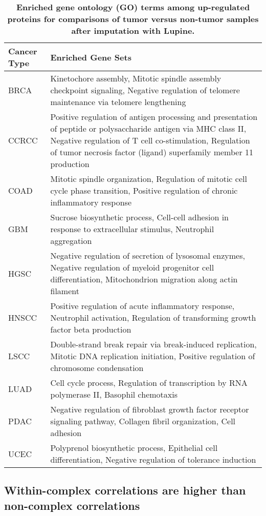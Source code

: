 \documentclass{article}
\begin{document}
\renewcommand{\arraystretch}{1.3}
\begin{table}
  \centering
  \begin{tabular}{l|p{14cm}}
    \hline
    Cancer Type & Enriched Gene Sets \\
    \hline
    BRCA & Kinetochore assembly, Mitotic spindle assembly checkpoint signaling, Negative regulation of telomere maintenance via telomere lengthening \\
    CCRCC & Positive regulation of antigen processing and presentation of peptide or polysaccharide antigen via MHC class II, Negative regulation of T cell co-stimulation, Regulation of tumor necrosis factor (ligand) superfamily member 11 production \\
    COAD & Mitotic spindle organization, Regulation of mitotic cell cycle phase transition, Positive regulation of chronic inflammatory response \\
    GBM & Sucrose biosynthetic process, Cell-cell adhesion in response to extracellular stimulus, Neutrophil aggregation \\
    HGSC & Negative regulation of secretion of lysosomal enzymes, Negative regulation of myeloid progenitor cell differentiation, Mitochondrion migration along actin filament \\
    HNSCC & Positive regulation of acute inflammatory response, Neutrophil activation, Regulation of transforming growth factor beta production \\
    LSCC & Double-strand break repair via break-induced replication, Mitotic DNA replication initiation, Positive regulation of chromosome condensation \\
    LUAD & Cell cycle process, Regulation of transcription by RNA polymerase II, Basophil chemotaxis \\
    PDAC & Negative regulation of fibroblast growth factor receptor signaling pathway, Collagen fibril organization, Cell adhesion \\
    UCEC & Polyprenol biosynthetic process, Epithelial cell differentiation, Negative regulation of tolerance induction \\
    \hline
  \end{tabular}
  \caption{{\bf Enriched gene ontology (GO) terms among up-regulated proteins for comparisons of tumor versus non-tumor samples after imputation with Lupine.}}
  \label{tab:gene-set-enrichment}
\end{table}

\subsection{Within-complex correlations are higher than non-complex correlations}
\end{document}
